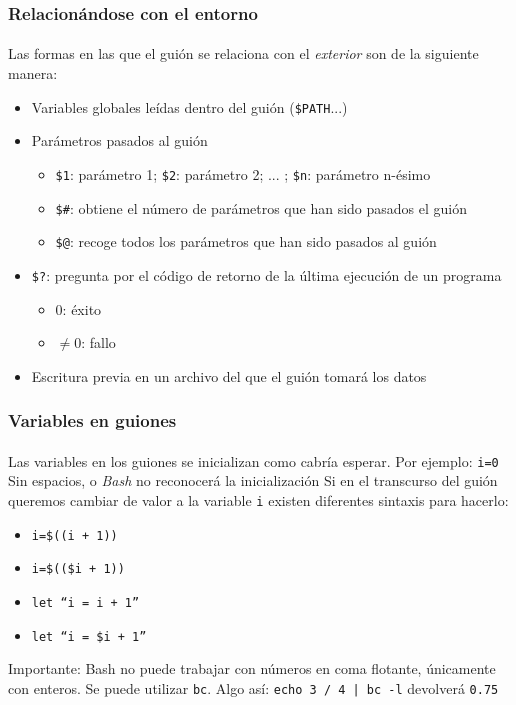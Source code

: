 \documentclass[12pt]{beamer}
\begin{document}
\begin{frame}
  \frametitle{Relacionándose con el entorno}
  \framesubtitle{}
  Las formas en las que el guión se relaciona con el \textit{exterior} son de la siguiente manera:
  \medskip
  \begin{itemize}
    \item Variables globales leídas dentro del guión (\texttt{\$PATH}...)
    \medskip
    \item Parámetros pasados al guión
    \begin{itemize}
      \item \texttt{\$1}: parámetro 1; \texttt{\$2}: parámetro 2; ... ; \texttt{\$n}: parámetro n-ésimo
      \item \texttt{\$\#}: obtiene el número de parámetros que han sido pasados el guión
      \item \texttt{\$@}: recoge todos los parámetros que han sido pasados al guión
    \end{itemize}
    \item \texttt{\$?}: pregunta por el código de retorno de la última ejecución de un programa
      \begin{itemize}
        \item 0: éxito
        \item $\neq$0: fallo
      \end{itemize}
    \item Escritura previa en un archivo del que el guión tomará los datos
  \end{itemize}
\end{frame}


\begin{frame}
  \frametitle{Variables en guiones}
  \framesubtitle{}
  Las variables en los guiones se inicializan como cabría esperar. Por ejemplo:
  \medskip\linebreak
  \texttt{i=0} \alert{Sin espacios, o \textit{Bash} no reconocerá la inicialización}
  \medskip\linebreak
  Si en el transcurso del guión queremos cambiar de valor a la variable \texttt{i} existen diferentes sintaxis para hacerlo:
  \medskip
  \begin{itemize}
    \item \texttt{i=\$((i + 1))}
    \item \texttt{i=\$((\$i + 1))}
    \item \texttt{let ``i = i + 1''}
    \item \texttt{let ``i = \$i + 1''}
  \end{itemize}
  \medskip
  \alert{Importante: Bash no puede trabajar con números en coma flotante, únicamente con enteros. Se puede utilizar \texttt{bc}. Algo así: \texttt{echo 3 / 4 | bc -l} devolverá \texttt{0.75}}
\end{frame}
\end{document}
